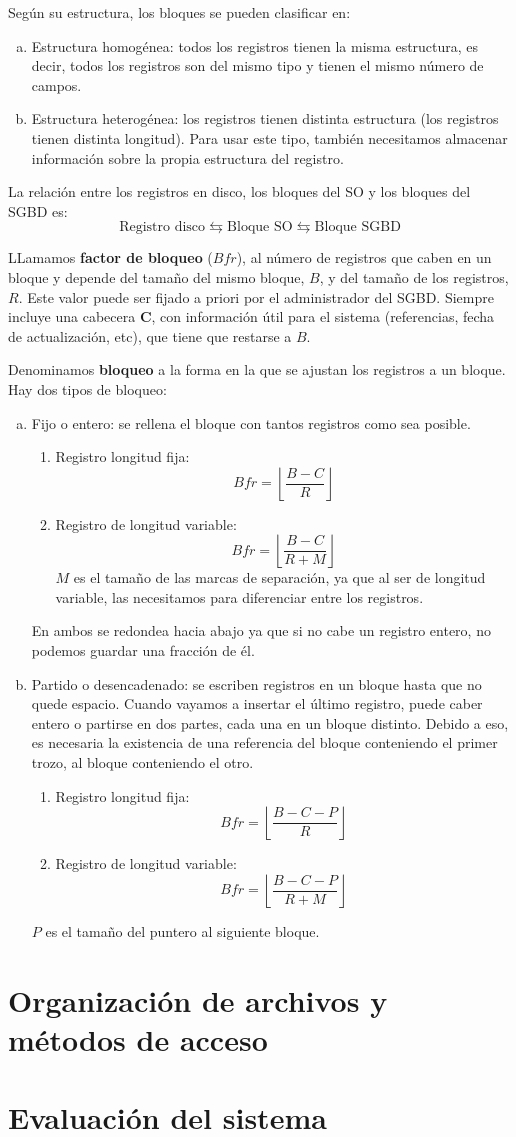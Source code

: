 Según su estructura, los bloques se pueden clasificar en:
\begin{enumerate}[(a)]
\item Estructura homogénea: todos los registros tienen la misma estructura, es decir, todos los registros son del mismo tipo y tienen el mismo número de campos.
\item Estructura heterogénea: los registros tienen distinta estructura (los registros tienen distinta longitud). Para usar este tipo, también necesitamos almacenar información sobre la propia estructura del registro.
\end{enumerate}

La relación entre los registros en disco, los bloques del SO y los bloques del SGBD es:
\[
\text{Registro disco} \leftrightarrows \text{Bloque SO} \leftrightarrows \text{Bloque SGBD}
\]

LLamamos \textbf{factor de bloqueo} ($Bfr$), al número de registros que caben en un bloque y depende del tamaño del mismo bloque, $B$, y del tamaño de los registros, $R$. Este valor puede ser fijado a priori por el administrador del SGBD. Siempre incluye una cabecera \textbf{C}, con información útil para el sistema (referencias, fecha de actualización, etc), que tiene que restarse a $B$.

Denominamos \textbf{bloqueo} a la forma en la que se ajustan los registros a un bloque. Hay dos tipos de bloqueo:

\begin{enumerate}[(a)]
\item Fijo o entero: se rellena el bloque con tantos registros como sea posible.
\begin{enumerate}
\item Registro longitud fija:
\[
Bfr=\left\lfloor\frac{B-C}{R}\right\rfloor
\]
\item Registro de longitud variable:
\[
Bfr=\left\lfloor\frac{B-C}{R+M}\right\rfloor
\]
$M$ es el tamaño de las marcas de separación, ya que al ser de longitud variable, las necesitamos para diferenciar entre los registros.
\end{enumerate}
En ambos se redondea hacia abajo ya que si no cabe un registro entero, no podemos guardar una fracción de él.
\item Partido o desencadenado: se escriben registros en un bloque hasta que no quede espacio. Cuando vayamos a insertar el último registro, puede caber entero o partirse en dos partes, cada una en un bloque distinto. Debido a eso, es necesaria la existencia de una referencia del bloque conteniendo el primer trozo, al bloque conteniendo el otro.
\begin{enumerate}
\item Registro longitud fija:
\[
Bfr=\left\lfloor\frac{B-C-P}{R}\right\rfloor
\]
\item Registro de longitud variable:
\[
Bfr=\left\lfloor\frac{B-C-P}{R+M}\right\rfloor
\]
\end{enumerate}
$P$ es el tamaño del puntero al siguiente bloque.
\end{enumerate}

\section{Organización de archivos y métodos de acceso}

\section{Evaluación del sistema}